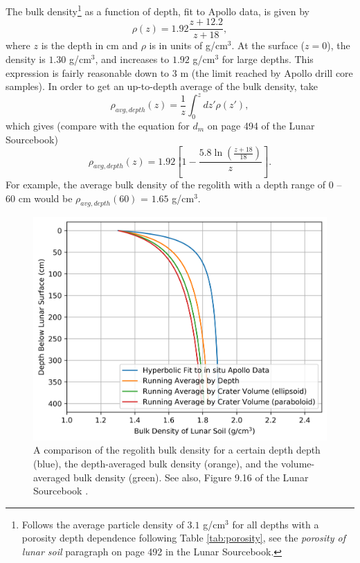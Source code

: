\documentclass{article}
\begin{document}
The bulk density\footnote{Follows the average particle density of $3.1$ g/cm$^3$ for all depths with a porosity depth dependence following Table \ref{tab:porosity}, see the \textit{porosity of lunar soil} paragraph on page 492 in the Lunar Sourcebook.} as a function of depth, fit to Apollo data, is given by
\begin{equation}\label{eq:regolith density vs depth}
\rho(z) = 1.92\frac{z+12.2}{z+18},
\end{equation}
where $z$ is the depth in cm and $\rho$ is in units of g/cm$^3$. At the surface ($z=0$), the density is $1.30$ g/cm$^3$, and increases to $1.92$ g/cm$^3$ for large depths. This expression is fairly reasonable down to $3$ m (the limit reached by Apollo drill core samples). In order to get an up-to-depth average of the bulk density, take
\begin{equation}
\rho_{avg, depth}(z) = \frac{1}{z}\int_{0}^{z}dz'\rho(z'), 
\end{equation}
which gives (compare with the equation for $d_m$ on page 494 of the Lunar Sourcebook)
\begin{equation}\label{eq:density depth averaged}
\rho_{avg, depth}(z) = 1.92\left[1 - \frac{5.8\ln\left(\frac{z + 18}{18}\right)}{z}\right].
\end{equation}
For example, the average bulk density of the regolith with a depth range of $0$ -- $60$ cm would be $\rho_{avg, depth}(60)$ = $1.65$ g/cm$^3$.



\begin{figure}[!htb]
	\centering
	\includegraphics[width=\linewidth]{regolith_density_vs_depth.png}
	\caption{A comparison of the regolith bulk density for a certain depth depth (blue), the depth-averaged bulk density (orange), and the volume-averaged bulk density (green). See also, Figure 9.16 of the Lunar Sourcebook \citep{heiken1991lunar}.}
	\label{fig:regolith_density_vs_depth}
\end{figure}
\end{document}
